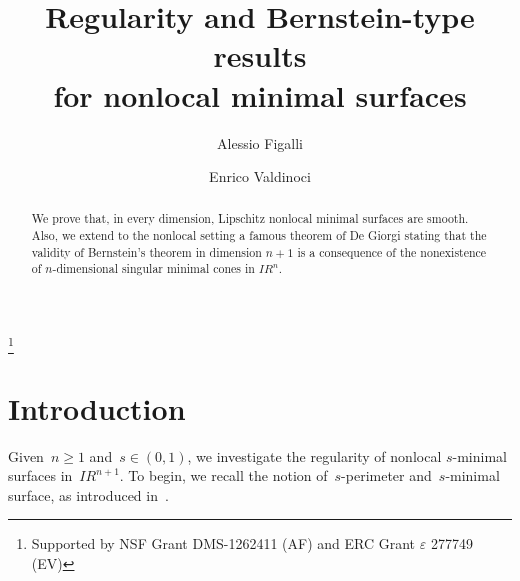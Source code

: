 \documentclass[11pt]{amsart}
\begin{document}
\author{Alessio Figalli}
\address{The University of Texas at Austin,
Mathematics Department RLM 8.100,
2515 Speedway Stop C1200,
Austin TX 78712-1202 (USA)}

\author{Enrico Valdinoci}
\address{Weierstra{\ss} Institut f\"ur Angewandte Analysis und Stochastik\\
Mohrenstra{\ss}e 39, D-10117 Berlin (Germany)}

\title[Regularity and Bernstein-type results for nonlocal minimal surfaces]{Regularity and Bernstein-type results\\
 for nonlocal minimal surfaces}

\begin{abstract}
We prove that, in every dimension, Lipschitz nonlocal minimal surfaces are smooth.
Also, we extend to the nonlocal setting a famous theorem of De Giorgi \cite{DG} stating that
the validity of Bernstein's theorem in dimension $n+1$ is a consequence of the nonexistence of  $n$-dimensional singular minimal cones in ${{I\!\!R}}^n$.
\end{abstract}

\thanks{Supported by 
NSF Grant DMS-1262411 (AF) and
ERC Grant ${\varepsilon}$ 277749 (EV)}

\maketitle

\section{Introduction}

Given~$n{\geqslant}1$ and~$s\in(0,1)$, we investigate the regularity of nonlocal $s$-minimal surfaces in~${{I\!\!R}}^{n+1}$.
To begin, we recall the notion of~$s$-perimeter and~$s$-minimal surface, as introduced in~\cite{CRS}.
\end{document}
